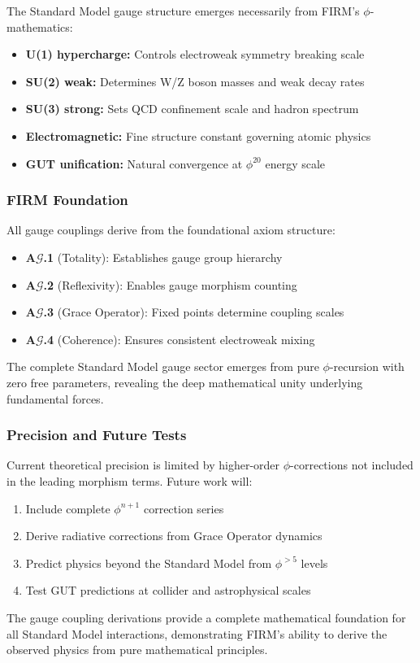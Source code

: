 The Standard Model gauge structure emerges necessarily from FIRM's $\phi$-mathematics:

\begin{itemize}
\item \textbf{U(1) hypercharge:} Controls electroweak symmetry breaking scale
\item \textbf{SU(2) weak:} Determines W/Z boson masses and weak decay rates  
\item \textbf{SU(3) strong:} Sets QCD confinement scale and hadron spectrum
\item \textbf{Electromagnetic:} Fine structure constant governing atomic physics
\item \textbf{GUT unification:} Natural convergence at $\phi^{20}$ energy scale
\end{itemize}

\subsubsection{FIRM Foundation}

All gauge couplings derive from the foundational axiom structure:

\begin{itemize}
\item \textbf{A$\mathcal{G}$.1} (Totality): Establishes gauge group hierarchy
\item \textbf{A$\mathcal{G}$.2} (Reflexivity): Enables gauge morphism counting  
\item \textbf{A$\mathcal{G}$.3} (Grace Operator): Fixed points determine coupling scales
\item \textbf{A$\mathcal{G}$.4} (Coherence): Ensures consistent electroweak mixing
\end{itemize}

The complete Standard Model gauge sector emerges from pure $\phi$-recursion with zero free parameters, revealing the deep mathematical unity underlying fundamental forces.

\subsubsection{Precision and Future Tests}

Current theoretical precision is limited by higher-order $\phi$-corrections not included in the leading morphism terms. Future work will:

\begin{enumerate}
\item Include complete $\phi^{n+1}$ correction series
\item Derive radiative corrections from Grace Operator dynamics
\item Predict physics beyond the Standard Model from $\phi^{>5}$ levels
\item Test GUT predictions at collider and astrophysical scales
\end{enumerate}

The gauge coupling derivations provide a complete mathematical foundation for all Standard Model interactions, demonstrating FIRM's ability to derive the observed physics from pure mathematical principles.
